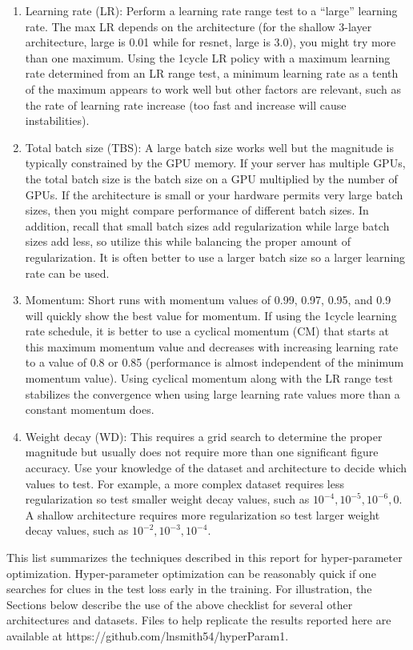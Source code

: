 \documentclass{article} %
\begin{document}
\begin{enumerate}
	\item Learning rate (LR): Perform a learning rate range test to a ``large'' learning rate.  The max LR depends on the architecture (for the shallow 3-layer architecture, large is 0.01 while for resnet, large is 3.0), you might try more than one maximum.  Using the 1cycle LR policy with a maximum learning rate determined from an LR range test, a minimum learning rate as a tenth of the maximum appears to work well but other factors are relevant, such as the rate of learning rate increase (too fast and increase will cause instabilities).
	\item Total batch size (TBS): A large batch size works well but the magnitude is typically constrained by the GPU memory.  If your server has multiple GPUs, the total batch size is the batch size on a GPU multiplied by the number of GPUs.  If the architecture is small or your hardware permits very large batch sizes, then you might compare performance of different batch sizes.  In addition, recall that small batch sizes add regularization while large batch sizes add less, so utilize this while balancing the proper amount of regularization.  It is often better to use a larger batch size so a larger learning rate can be used.
	\item Momentum: Short runs with momentum values of 0.99, 0.97, 0.95, and 0.9 will quickly show the best value for momentum.  If using the 1cycle learning rate schedule, it is better to use a cyclical momentum (CM) that starts at this maximum momentum value and decreases with increasing learning rate to a value of 0.8 or 0.85 (performance is almost independent of the minimum momentum value).  Using cyclical momentum along with the LR range test stabilizes the convergence when using large learning rate values more than a constant momentum does.
	\item Weight decay (WD): This requires a grid search to determine the proper magnitude but usually does not require more than one significant figure accuracy.  Use your knowledge of the dataset and architecture to decide which values to test.  For example, a more complex dataset requires less regularization so test smaller weight decay values, such as $10^{-4}, 10^{-5}, 10^{-6}, 0$.  A shallow architecture requires more regularization  so test larger weight decay values, such as $10^{-2}, 10^{-3}, 10^{-4}$.
\end{enumerate}  

This list summarizes the techniques described in this report for hyper-parameter optimization. Hyper-parameter optimization can be reasonably quick if one searches for clues in the test loss early in the training.  For illustration, the Sections below describe the use of the above checklist for several other architectures and datasets.  Files to help replicate the results reported here are available at https://github.com/lnsmith54/hyperParam1.
\end{document}
